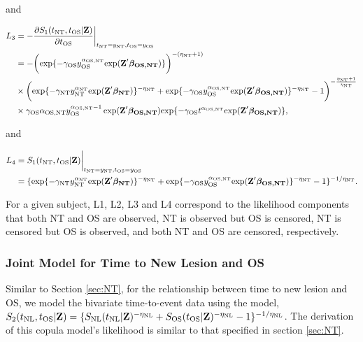 and


\begin{align*}
L_3&=-\frac{\partial S_1(t_{\rm NT}, t_{\rm OS}|\textbf{Z})}{\partial t_{\rm OS}}\bigg|_{t_{\rm NT}=y_{\rm NT},t_{\rm OS}=y_{\rm OS}}\\
&=-\bigg(\mathrm{exp}\{-\gamma_{\rm OS} y_{\rm OS}^{\alpha_{\rm OS,NT}}
\mathrm{exp}(\textbf{Z}' \boldsymbol{\beta_{\rm OS,NT}} )\}\bigg)^{-(\eta_{\rm NT}+1)}\\
&\times \bigg(\mathrm{exp}\{-\gamma_{\rm NT} y_{\rm NT}^{\alpha_{\rm NT}}
\mathrm{exp}(\textbf{Z}' \boldsymbol{\beta_{\rm NT}} )\}^{-\eta_{\rm NT}}+\mathrm{exp}\{-\gamma_{\rm OS} y_{\rm OS}^{\alpha_{\rm OS,NT}}
\mathrm{exp}(\textbf{Z}' \boldsymbol{\beta_{\rm OS,NT}} )\}^{-\eta_{\rm NT}}-1\bigg)^{-\frac{\eta_{\rm NT}+1}{\eta_{\rm NT}}}\\
&\times \gamma_{\rm OS} \alpha_{\rm OS,NT} y_{\rm OS}^{{\alpha_{\rm OS,NT} -1}} \exp(\textbf{Z}' \boldsymbol{\beta_{\rm OS,NT}}) \mathrm{exp}\{-\gamma_{\rm OS} t^{\alpha_{\rm OS,NT}}
\mathrm{exp}(\textbf{Z}' \boldsymbol{\beta_{\rm OS,NT}} )\},
\end{align*}


and

\begin{align*}
L_4&=S_1(t_{\rm NT}, t_{\rm OS}|\textbf{Z})\bigg|_{t_{\rm NT}=y_{\rm NT},t_{\rm OS}=y_{\rm OS}}\\
&=\{\mathrm{exp}\{-\gamma_{\rm NT} y_{\rm NT}^{\alpha_{\rm NT}}
\mathrm{exp}(\textbf{Z}' \boldsymbol{\beta_{\rm NT}} )\}^{-\eta_{\rm NT}}
+\mathrm{exp}\{-\gamma_{\rm OS} y_{\rm OS}^{\alpha_{\rm OS,NT}}
\mathrm{exp}(\textbf{Z}' \boldsymbol{\beta_{\rm OS,NT}} )\}^{-\eta_{\rm NT}}-1\}^{-1/\eta_{\rm NT}}.
\end{align*}

For a given subject, L1, L2, L3 and L4 correspond to the likelihood components that both NT and OS are observed, NT is observed but OS is censored, NT is censored but OS is observed, and both NT and OS are censored, respectively.



\subsubsection{Joint Model for Time to New Lesion and OS} \label{sec:NL}
Similar to Section \ref{sec:NT}, for the relationship between time to new lesion and OS, we model
the bivariate time-to-event data using the \cite{clayton1978model} model,
$S_2(t_{\rm NL},
t_{\rm OS}|\textbf{Z})=\{S_{\rm NL}(t_{\rm NL}|\textbf{Z})^{-\eta_{\rm NL}}
+S_{\rm OS}(t_{\rm OS}|\textbf{Z})^{-\eta_{\rm NL}}-1\}^{-1/\eta_{\rm NL}}$. The derivation of this copula model's likelihood is similar to that specified in section \ref{sec:NT}.

